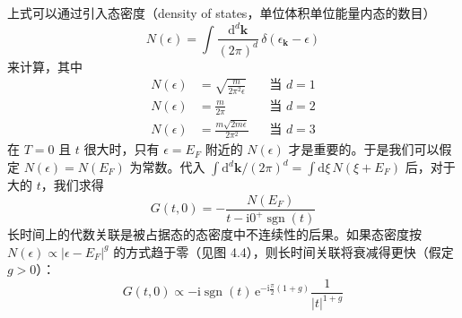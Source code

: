 
上式可以通过引入态密度（density of states，单位体积单位能量内态的数目）
\begin{equation*}
N(\epsilon) = \int \frac{\mathrm{d}^{d}\pmb{k}}{(2\pi)^{d}}\,\delta(\epsilon_{\pmb{k}} - \epsilon)
\end{equation*}
来计算，其中
\begin{align*}
N(\epsilon) &= \sqrt{\frac{m}{2\pi^{2}\epsilon}} && \text{当 } d = 1\\
N(\epsilon) &= \frac{m}{2\pi} && \text{当 } d = 2\\
N(\epsilon) &= \frac{m\sqrt{2m\epsilon}}{2\pi^{2}} && \text{当 } d = 3 \tag{4.2.12}
\end{align*}
在 $T = 0$ 且 $t$ 很大时，只有 $\epsilon = E_{F}$ 附近的 $N(\epsilon)$ 才是重要的。于是我们可以假定 $N(\epsilon) = N(E_{F})$ 为常数。代入 $\int \mathrm{d}^{d}\pmb{k}/(2\pi)^{d} = \int \mathrm{d}\xi\, N(\xi + E_{F})$ 后，对于大的 $t$，我们求得
\begin{equation*}
G(t, 0) = -\frac{N(E_{F})}{t - \mathrm{i}0^{+}\operatorname{sgn}(t)}
\end{equation*}
长时间上的代数关联是被占据态的态密度中不连续性的后果。如果态密度按 $N(\epsilon) \propto |\epsilon - E_{F}|^{g}$ 的方式趋于零（见图 4.4），则长时间关联将衰减得更快（假定 $g > 0$）：
\begin{equation*}
G(t, 0) \propto -\mathrm{i}\operatorname{sgn}(t)\,\mathrm{e}^{-\mathrm{i}\frac{\pi}{2}(1+g)}\frac{1}{|t|^{1+g}}
\end{equation*}

